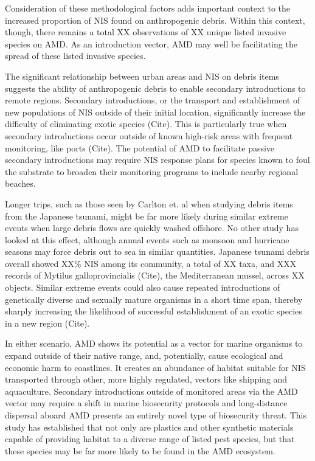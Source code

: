 \documentclass[a4paper, nobind]{templates/ociamthesis}
\begin{document}
Consideration of these methodological factors adds important context to the increased proportion of NIS found on anthropogenic debris. Within this context, though, there remains a total XX observations of XX unique listed invasive species on AMD. As an introduction vector, AMD may well be facilitating the spread of these listed invasive species.

The significant relationship between urban areas and NIS on debris items suggests the ability of anthropogenic debris to enable secondary introductions to remote regions. Secondary introductions, or the transport and establishment of new populations of NIS outside of their initial location, significantly increase the difficulty of eliminating exotic species (Cite). This is particularly true when secondary introductions occur outside of known high-risk areas with frequent monitoring, like ports (Cite). The potential of AMD to facilitate passive secondary introductions may require NIS response plans for species known to foul the substrate to broaden their monitoring programs to include nearby regional beaches.

Longer trips, such as those seen by Carlton et. al when studying debris items from the Japanese tsunami, might be far more likely during similar extreme events when large debris flows are quickly washed offshore. No other study has looked at this effect, although annual events such as monsoon and hurricane seasons may force debris out to sea in similar quantities. Japanese tsunami debris overall showed XX\% NIS among its community, a total of XX taxa, and XXX records of Mytilus galloprovincialis (Cite), the Mediterranean mussel, across XX objects. Similar extreme events could also cause repeated introductions of genetically diverse and sexually mature organisms in a short time span, thereby sharply increasing the likelihood of successful establishment of an exotic species in a new region (Cite).

In either scenario, AMD shows its potential as a vector for marine organisms to expand outside of their native range, and, potentially, cause ecological and economic harm to coastlines. It creates an abundance of habitat suitable for NIS transported through other, more highly regulated, vectors like shipping and aquaculture. Secondary introductions outside of monitored areas via the AMD vector may require a shift in marine biosecurity protocols and long-distance dispersal aboard AMD presents an entirely novel type of biosecurity threat. This study has established that not only are plastics and other synthetic materials capable of providing habitat to a diverse range of listed pest species, but that these species may be far more likely to be found in the AMD ecosystem.
\end{document}
